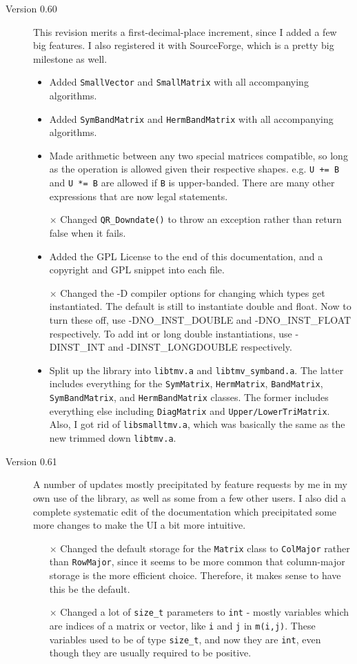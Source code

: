 \documentclass[twoside,letterpaper,11pt]{article}
\renewcommand{\tt}[1]{{\texttt {#1}}}
\begin{document}
\begin{description}
\item[Version 0.60]
This revision merits a first-decimal-place increment, since I added a 
few big features.  I also registered it with SourceForge, 
which is a pretty big milestone as well.
\begin{itemize}
\item
Added \tt{SmallVector} and \tt{SmallMatrix} with all accompanying algorithms.
\item 
Added \tt{SymBandMatrix} and \tt{HermBandMatrix} with all accompanying algorithms.
\item
Made arithmetic between any two special matrices compatible, so long as 
the operation is allowed given their respective shapes.  
e.g. \tt{U += B} and \tt{U *= B} are allowed if \tt{B} is upper-banded.  
There are many other expressions that are now legal statements.
\item[$\times$]
Changed \tt{QR\_Downdate()} to throw an exception rather than return false
when it fails.
\item
Added the GPL License to the end of this documentation, and a copyright
and GPL snippet into each file.
\item[$\times$]
Changed the -D compiler options for changing which types get instantiated.
The default is still to instantiate double and float.  Now to turn these
off, use -DNO\_INST\_DOUBLE and -DNO\_INST\_FLOAT respectively.  To
add int or long double instantiations, use -DINST\_INT and 
-DINST\_LONGDOUBLE respectively.
\item
Split up the library into \tt{libtmv.a} and \tt{libtmv\_symband.a}.  The
latter includes everything for the \tt{SymMatrix}, \tt{HermMatrix}, 
\tt{BandMatrix}, \tt{SymBandMatrix}, and \tt{HermBandMatrix} classes.
The former includes everything else including \tt{DiagMatrix} and
\tt{Upper/LowerTriMatrix}.  Also, I got rid of \tt{libsmalltmv.a}, which
was basically the same as the new trimmed down \tt{libtmv.a}.

\end{itemize}

\item[Version 0.61]
A number of updates mostly precipitated by feature requests by me in my own
use of the library, as well as some from a few other users.
I also did a complete systematic edit of the documentation which 
precipitated some more changes to make the UI a bit more intuitive.
\begin{itemize}
\item[$\times$]
Changed the default storage for the \tt{Matrix} class to \tt{ColMajor}
rather than \tt{RowMajor}, since it seems to be more common that column-major
storage is the more efficient choice.  Therefore, it makes sense to have this
be the default.
\item[$\times$]
Changed a lot of \tt{size\_t} parameters to \tt{int} - mostly variables
which are indices of a matrix or vector, like \tt{i} and \tt{j} in \tt{m(i,j)}.  
These variables used to be of type \tt{size\_t}, and now they are \tt{int},
even though they are 
usually required to be positive.  


\end{itemize}
\end{description}
\end{document}
